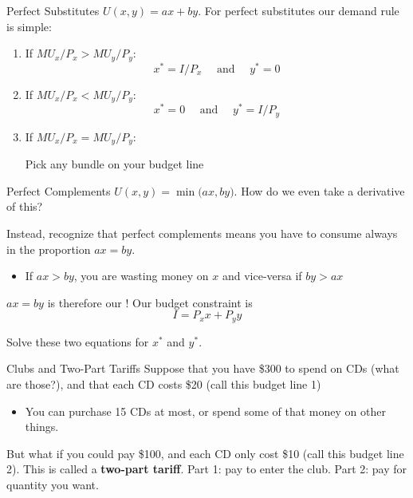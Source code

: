 \documentclass[11pt,t]{beamer}
\begin{document}
\begin{frame}{Perfect Substitutes}
  $U(x,y) = ax + by$. For perfect substitutes our demand rule is simple: 
  
  \bigskip
  \begin{enumerate}
    \item If $MU_x/P_x > MU_y / P_y$: 
    $$
      x^* = I / P_x \quad\text{ and }\quad y^* = 0
    $$

    \item If $MU_x/P_x < MU_y / P_y$: 
    $$
      x^* = 0 \quad\text{ and }\quad y^* = I / P_y
    $$
    
    \item If $MU_x/P_x = MU_y / P_y$: 
    
    \begin{center}
      Pick any bundle on your budget line 
    \end{center}
  \end{enumerate}
\end{frame}

\begin{frame}{Perfect Complements}
  $U(x,y) = \min\big( ax, by \big)$. How do we even take a derivative of this?

  \pause\bigskip
  Instead, recognize that perfect complements means you have to consume always in the proportion $ax = by$. 
  \begin{itemize}
    \item If $ax > by$, you are wasting money on $x$ and vice-versa if $by > ax$
  \end{itemize}

  \pause\bigskip
  $ax = by$ is therefore our ! Our budget constraint is 
  $$
    I = P_x x + P_y y
  $$

  \bigskip
  Solve these two equations for $x^*$ and $y^*$.
\end{frame}


\begin{frame}{Clubs and Two-Part Tariffs}
  Suppose that you have \$300 to spend on CDs (what are those?), and that each CD costs \$20 (call this budget line 1)

  \begin{itemize}
    \item You can purchase 15 CDs at most, or spend some of that money on other things.
  \end{itemize}

  \bigskip
  But what if you could pay \$100, and each CD only cost \$10 (call this budget line 2). This is called a \textbf{two-part tariff}. Part 1: pay to enter the club. Part 2: pay for quantity you want.
\end{frame}
\end{document}
